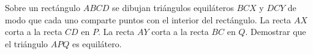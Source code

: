 Sobre un rectángulo $ABCD$ se dibujan triángulos equiláteros $BCX$ y $DCY$ de modo que cada uno comparte puntos con el interior del rectángulo. La recta $AX$ corta a la recta $CD$ en $P$. La recta $AY$ corta a la recta $BC$ en $Q$. Demostrar que el triángulo $APQ$ es equilátero.

